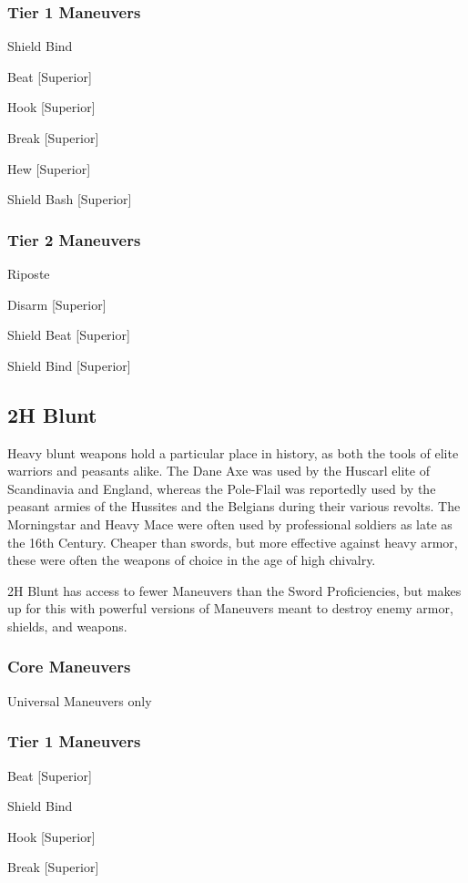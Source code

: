 \documentclass[oneside,11pt,english]{book}
\begin{document}
\subsubsection{Tier 1 Maneuvers}
Shield Bind

Beat [Superior]

Hook [Superior] 

Break [Superior] 

Hew [Superior] 

Shield Bash [Superior] 

\subsubsection{Tier 2 Maneuvers}
Riposte

Disarm [Superior] 

Shield Beat [Superior] 

Shield Bind [Superior] 

\subsection{2H Blunt}
Heavy blunt weapons hold a particular place in history, as both the tools of elite warriors and 
peasants alike. The Dane Axe was used by the Huscarl elite of Scandinavia and England, whereas the 
Pole-Flail was reportedly used by the peasant armies of the Hussites and the Belgians during their various 
revolts. The Morningstar and Heavy Mace were often used by professional soldiers as late as the 16th 
Century. Cheaper than swords, but more effective against heavy armor, these were often the weapons of 
choice in the age of high chivalry.

2H Blunt has access to fewer Maneuvers than the Sword Proficiencies, but makes up for this with 
powerful versions of Maneuvers meant to destroy enemy armor, shields, and weapons. 

\subsubsection{Core Maneuvers}
Universal Maneuvers only

\subsubsection{Tier 1 Maneuvers}
Beat [Superior]

Shield Bind 

Hook [Superior] 

Break [Superior] 
\end{document}
